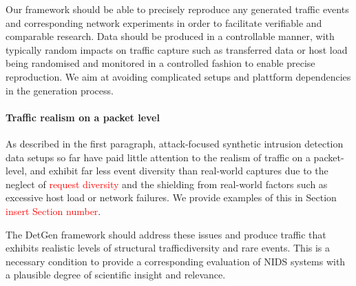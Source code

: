\documentclass{article}
\begin{document}
Our framework should be able to precisely reproduce any generated traffic events and corresponding network experiments in order to facilitate verifiable and comparable research. Data should be produced in a controllable manner, with typically random impacts on traffic capture such as transferred data or host load being randomised and monitored in a controlled fashion to enable precise reproduction. We aim at avoiding complicated setups and plattform dependencies in the generation process. 

\paragraph{Traffic realism on a packet level} As described in the first paragraph, attack-focused synthetic intrusion detection data setups so far have paid little attention to the realism of traffic on a packet-level, and exhibit far less event diversity than real-world captures due to the neglect of \textcolor{red}{request diversity} and the shielding from real-world factors such as excessive host load or network failures. We provide examples of this in Section \textcolor{red}{insert Section number}.

The DetGen framework should address these issues and produce traffic that exhibits realistic levels of structural trafficdiversity and rare events. This is a necessary condition to provide a corresponding evaluation of NIDS systems with a plausible degree of scientific insight and relevance. %



\end{document}
